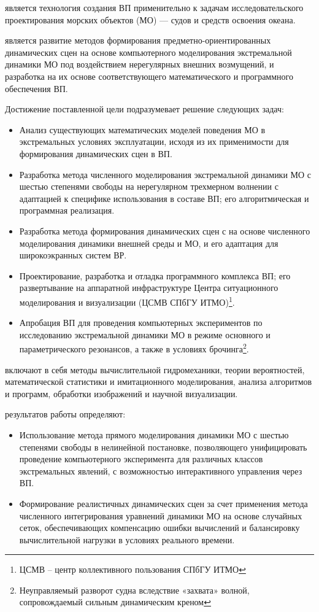  является технология создания ВП применительно к задачам исследовательского проектирования морских объектов (МО) --- судов и средств освоения океана.

 является развитие методов формирования предметно-ориентированных динамических сцен на основе компьютерного моделирования экстремальной динамики МО под воздействием нерегулярных внешних возмущений, и разработка на их основе соответствующего математического и программного обеспечения ВП.

 Достижение поставленной цели подразумевает решение следующих задач:
\begin{itemize}
\item Анализ существующих математических моделей поведения МО в экстремальных условиях эксплуатации, исходя из их применимости для формирования динамических сцен в ВП.
\item Разработка метода численного моделирования экстремальной динамики МО с шестью степенями свободы на нерегулярном трехмерном волнении с адаптацией к специфике использования в составе ВП; его алгоритмическая и программная реализация.
\item Разработка метода формирования динамических сцен с на основе численного моделирования динамики внешней среды и МО, и его адаптация для широкоэкранных систем ВР.  
\item Проектирование, разработка и отладка программного комплекса ВП; его развертывание на аппаратной инфраструктуре Центра ситуационного моделирования и визуализации (ЦСМВ СПбГУ ИТМО)\footnote{ЦСМВ – центр коллективного пользования СПбГУ ИТМО}.
\item Апробация ВП для проведения компьютерных экспериментов по исследованию экстремальной динамики МО в режиме основного и параметрического резонансов, а также в условиях брочинга\footnote{Неуправляемый разворот судна вследствие «захвата» волной, сопровождаемый сильным динамическим креном}. 
\end{itemize}

 включают в себя методы вычислительной гидромеханики, теории вероятностей, математической статистики и имитационного моделирования, анализа алгоритмов и программ, обработки изображений и научной визуализации.


 результатов работы определяют:
\begin{itemize}
	\item	Использование метода прямого моделирования динамики МО с шестью степенями свободы в нелинейной постановке, позволяющего унифицировать проведение компьютерного эксперимента для различных классов экстремальных явлений, с возможностью интерактивного управления через ВП.
	\item	Формирование реалистичных динамических сцен за счет применения метода численного интегрирования уравнений динамики МО на основе случайных сеток, обеспечивающих компенсацию ошибки вычислений и балансировку вычислительной нагрузки в условиях реального времени.
\end{itemize}



